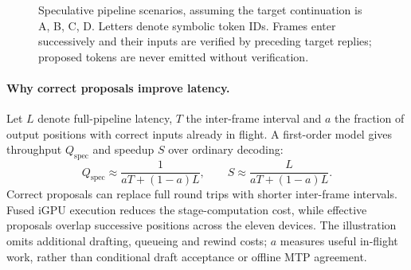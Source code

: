 \documentclass[11pt]{article}
\begin{document}
\begin{figure}[ht]
\centering
{}
\caption{Speculative pipeline scenarios, assuming the target continuation is A, B, C, D. Letters denote symbolic token IDs. Frames enter successively and their inputs are verified by preceding target replies; proposed tokens are never emitted without verification.}
\label{fig:speculation}
\end{figure}

\paragraph{Why correct proposals improve latency.}
Let $L$ denote full-pipeline latency, $T$ the inter-frame interval and $a$ the fraction of output positions with correct inputs already in flight. A first-order model gives throughput $Q_{\mathrm{spec}}$ and speedup $S$ over ordinary decoding:
\begin{equation}
Q_{\mathrm{spec}}\approx\frac{1}{aT+(1-a)L},\qquad
S\approx\frac{L}{aT+(1-a)L}.
\label{eq:speculation}
\end{equation}
Correct proposals can replace full round trips with shorter inter-frame intervals. Fused iGPU execution reduces the stage-computation cost, while effective proposals overlap successive positions across the eleven devices. The illustration omits additional drafting, queueing and rewind costs; $a$ measures useful in-flight work, rather than conditional draft acceptance or offline MTP agreement.
\end{document}
